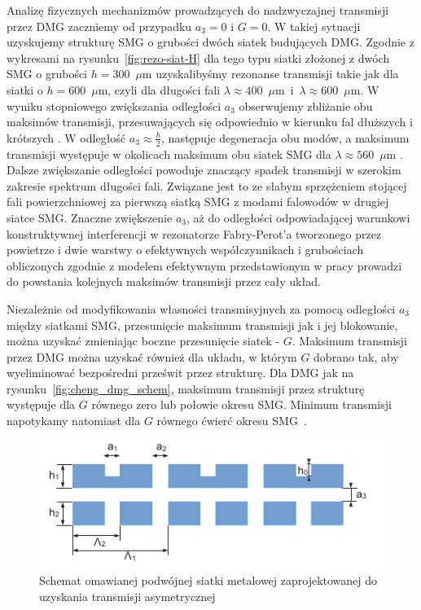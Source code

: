 Analizę fizycznych mechanizmów prowadzących do nadzwyczajnej transmisji przez DMG zaczniemy od przypadku $a_3=0$ i $G=0$. W takiej sytuacji uzyskujemy strukturę SMG o grubości dwóch siatek budujących DMG. Zgodnie z wykresami na rysunku~\ref{fig:rezo-siat-H} dla tego typu siatki złożonej z dwóch SMG o grubości $h=300$~$\mu$m uzyskalibyśmy rezonanse transmisji takie jak dla siatki o $h=600$~$\mu$m, czyli dla długości fali $\lambda \approx 400$~$\mu$m~i~$\lambda \approx 600$~$\mu$m. W wyniku stopniowego zwiększania odległości $a_3$ obserwujemy zbliżanie obu maksimów transmisji, przesuwających się odpowiednio w kierunku fal dłuższych i krótszych \cite{cheng2008physical}. W odległość $a_3 \approx \frac{h}{2}$, następuje degeneracja obu modów, a maksimum transmisji występuje w okolicach maksimum obu siatek SMG dla $\lambda \approx 560$~$\mu$m \cite{cheng2008physical}. Dalsze zwiększanie odległości powoduje znaczący spadek transmisji w szerokim zakresie spektrum długości fali. Związane jest to ze słabym sprzężeniem stojącej fali powierzchniowej za pierwszą siatką SMG z modami falowodów w drugiej siatce SMG. Znaczne zwiększenie $a_3$, aż do odległości odpowiadającej warunkowi konstruktywnej interferencji w rezonatorze Fabry-Perot'a tworzonego przez powietrze i dwie warstwy o efektywnych współczynnikach i grubościach obliczonych zgodnie z modelem efektywnym przedstawionym w pracy \cite{shen2005mechanism} prowadzi do powstania kolejnych maksimów transmisji przez cały układ.

Niezależnie od modyfikowania własności transmisyjnych za pomocą odległości $a_3$ między siatkami SMG, przesunięcie maksimum transmisji jak i jej blokowanie, można uzyskać zmieniając boczne przesunięcie siatek - $G$. Maksimum transmisji przez DMG można uzyskać również dla układu, w którym $G$ dobrano tak, aby wyeliminować bezpośredni prześwit przez strukturę. Dla DMG jak na rysunku~\ref{fig:cheng_dmg_schem}, maksimum transmisji przez strukturę występuje dla $G$ równego zero lub połowie okresu SMG. Minimum transmisji napotykamy natomiast dla $G$ równego ćwierć okresu SMG~\cite{chan2006optical}.

\begin{figure}[tb]
	\includegraphics[width=\textwidth]{images/thz/1D-DMG-schemat.png}
	\caption{Schemat omawianej podwójnej siatki metalowej zaprojektowanej do uzyskania transmisji asymetrycznej}
	\label{fig:1ddmg-schem}
\end{figure}


